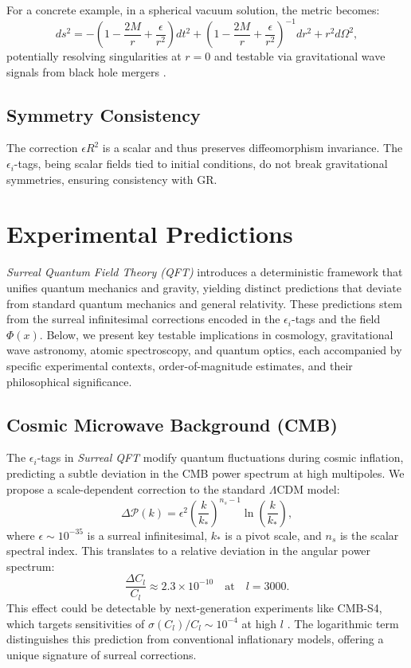 \documentclass{article}
\begin{document}
For a concrete example, in a spherical vacuum solution, the metric becomes:
\begin{equation}
ds^2 = -\left(1 - \frac{2M}{r} + \frac{\epsilon}{r^2}\right) dt^2 + \left(1 - \frac{2M}{r} + \frac{\epsilon}{r^2}\right)^{-1} dr^2 + r^2 d\Omega^2,
\end{equation}
potentially resolving singularities at \(r = 0\) and testable via gravitational wave signals from black hole mergers \cite{LIGO2016}.

\subsection{Symmetry Consistency}
The correction \(\epsilon R^2\) is a scalar and thus preserves diffeomorphism invariance. The \(\epsilon_i\)-tags, being scalar fields tied to initial conditions, do not break gravitational symmetries, ensuring consistency with GR.

\section{Experimental Predictions}
\textit{Surreal Quantum Field Theory (QFT)} introduces a deterministic framework that unifies quantum mechanics and gravity, yielding distinct predictions that deviate from standard quantum mechanics and general relativity. These predictions stem from the surreal infinitesimal corrections encoded in the \(\epsilon_i\)-tags and the field \(\Phi(x)\). Below, we present key testable implications in cosmology, gravitational wave astronomy, atomic spectroscopy, and quantum optics, each accompanied by specific experimental contexts, order-of-magnitude estimates, and their philosophical significance.

\subsection{Cosmic Microwave Background (CMB)}
The \(\epsilon_i\)-tags in \textit{Surreal QFT} modify quantum fluctuations during cosmic inflation, predicting a subtle deviation in the CMB power spectrum at high multipoles. We propose a scale-dependent correction to the standard \(\Lambda\)CDM model:
\begin{equation}
\Delta \mathcal{P}(k) = \epsilon^2 \left( \frac{k}{k_*} \right)^{n_s - 1} \ln \left( \frac{k}{k_*} \right),
\end{equation}
where \(\epsilon \sim 10^{-35}\) is a surreal infinitesimal, \(k_*\) is a pivot scale, and \(n_s\) is the scalar spectral index. This translates to a relative deviation in the angular power spectrum:
\begin{equation}
\frac{\Delta C_l}{C_l} \approx 2.3 \times 10^{-10} \quad \text{at} \quad l = 3000.
\end{equation}
This effect could be detectable by next-generation experiments like CMB-S4, which targets sensitivities of \(\sigma(C_l) / C_l \sim 10^{-4}\) at high \(l\) \cite{SimonsObs2024}. The logarithmic term distinguishes this prediction from conventional inflationary models, offering a unique signature of surreal corrections.
\end{document}
